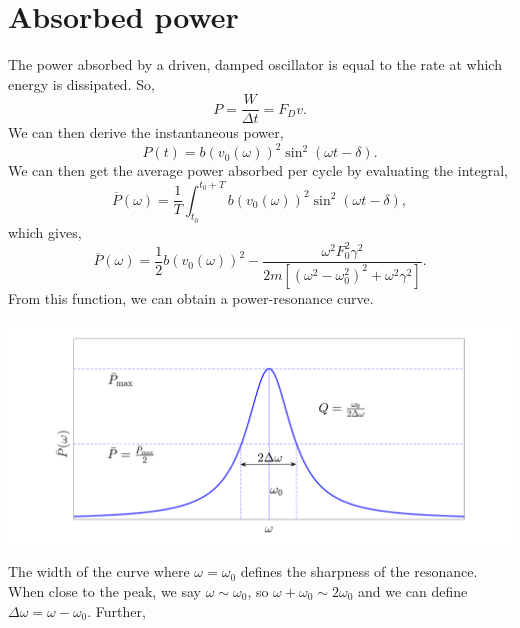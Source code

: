 \documentclass{book}
\begin{document}
\section{Absorbed power}
The power absorbed by a driven, damped oscillator is equal to the rate at which energy is dissipated. So,
\begin{equation}
    P = \frac{W}{\Delta t} = F_D v.
\end{equation}
We can then derive the instantaneous power,
\begin{equation}
    P(t) = b(v_0(\omega))^2\sin^2(\omega t - \delta).
\end{equation}
We can then get the average power absorbed per cycle by evaluating the integral, 
\begin{equation}
    \overline{P}(\omega) = \frac{1}{T}\int_{t_0}^{t_0 + T}b(v_0(\omega))^2\sin^2(\omega t - \delta),
\end{equation}
which gives,
\begin{equation}
    \overline{P}(\omega) = \frac{1}{2}b(v_0(\omega))^2 - \frac{\omega^2 F_0^2 \gamma^2}{2m\left[\left(\omega^2 -\omega_0^2\right)^2 + \omega^2\gamma^2\right]}.
\end{equation}
From this function, we can obtain a power-resonance curve.
\begin{center}
    \includegraphics[width=\textwidth]{Power_resonance.pdf}
\end{center}
The width of the curve where $\omega = \omega_0$ defines the sharpness of the resonance. When close to the peak, we say $\omega \sim \omega_0$, so $\omega + \omega_0 \sim 2\omega_0$ and we can define $\Delta \omega = \omega - \omega_0$. Further,
\end{document}

